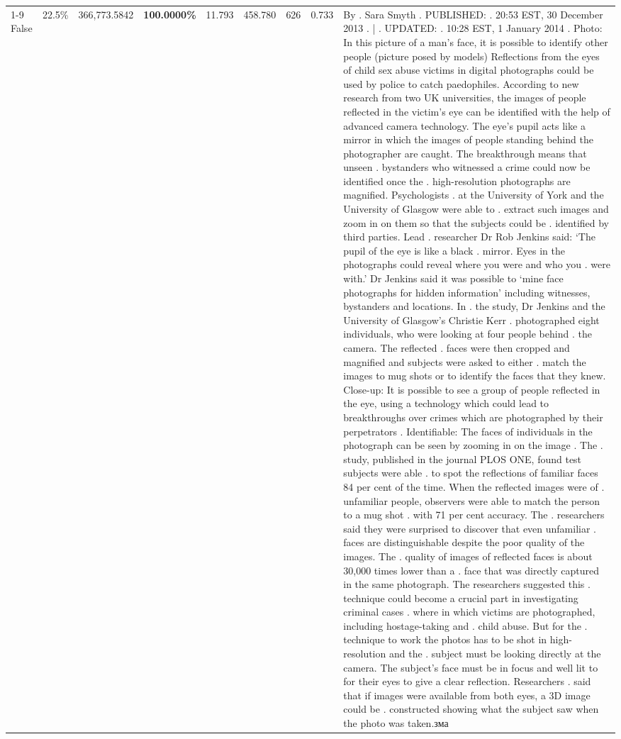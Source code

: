 \begin{table}[H]
\begin{tabular}{lllrlllll}
\cline{1-9}
False & 22.5\% & 366,773.5842 & \bfseries \color{red} 100.0000\% & 11.793 & 458.780 & 626 & 0.733 & By . Sara Smyth . PUBLISHED: . 20:53 EST, 30 December 2013 . | . UPDATED: . 10:28 EST, 1 January 2014 . Photo: In this picture of a man's face, it is possible to identify other people (picture posed by models) Reflections from the eyes of child sex abuse victims in digital photographs could be used by police to catch paedophiles. According to new research from two UK universities, the images of people reflected in the victim's eye can be identified with the help of advanced camera technology. The eye's pupil acts like a mirror in which the images of people standing behind the photographer are caught. The breakthrough means that unseen . bystanders who witnessed a crime could now be identified once the . high-resolution photographs are magnified. Psychologists . at the University of York and the University of Glasgow were able to . extract such images and zoom in on them so that the subjects could be . identified by third parties. Lead . researcher Dr Rob Jenkins said: ‘The pupil of the eye is like a black . mirror. Eyes in the photographs could reveal where you were and who you . were with.' Dr Jenkins said it was possible to ‘mine face photographs for hidden information' including witnesses, bystanders and locations. In . the study, Dr Jenkins and the University of Glasgow's Christie Kerr . photographed eight individuals, who were looking at four people behind . the camera. The reflected . faces were then cropped and magnified and subjects were asked to either . match the images to mug shots or to identify the faces that they knew. Close-up: It is possible to see a group of people reflected in the eye, using a technology which could lead to breakthroughs over crimes which are photographed by their perpetrators . Identifiable: The faces of individuals in the photograph can be seen by zooming in on the image . The . study, published in the journal PLOS ONE, found test subjects were able . to spot the reflections of familiar faces 84 per cent of the time. When the reflected images were of . unfamiliar people, observers were able to match the person to a mug shot . with 71 per cent accuracy. The . researchers said they were surprised to discover that even unfamiliar . faces are distinguishable despite the poor quality of the images. The . quality of images of reflected faces is about 30,000 times lower than a . face that was directly captured in the same photograph. The researchers suggested this . technique could become a crucial part in investigating criminal cases . where in which victims are photographed, including hostage-taking and . child abuse. But for the . technique to work the photos has to be shot in high-resolution and the . subject must be looking directly at the camera. The subject's face must be in focus and well lit to for their eyes to give a clear reflection. Researchers . said that if images were available from both eyes, a 3D image could be . constructed showing what the subject saw when the photo was taken.зма \\

\end{tabular}
\end{table}

